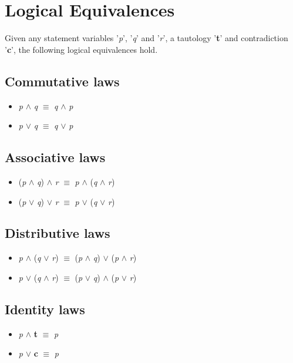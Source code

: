 \documentclass{article}
\begin{document}
\section{Logical Equivalences}

Given any statement variables '\textit{p}', '\textit{q}' and '\textit{r}', a tautology '\textbf{t}' and contradiction '\textbf{c}', the following
logical equivalences hold.


\subsection{Commutative laws}
\begin{itemize} 
\item \textit{p} $\wedge$ \textit{q} $\equiv$ \textit{q} $\wedge$ \textit{p}
\item \textit{p} $\lor$ \textit{q} $\equiv$ \textit{q} $\lor$ \textit{p}
\end{itemize}

\subsection{Associative laws}
\begin{itemize}
\item (\textit{p} $\wedge$ \textit{q}) $\wedge$ \textit{r} $\equiv$ \textit{p} $\wedge$ (\textit{q} $\wedge$ \textit{r})
\item (\textit{p} $\lor$ \textit{q}) $\lor$ \textit{r} $\equiv$ \textit{p} $\lor$ (\textit{q} $\lor$ \textit{r})
\end{itemize}

\subsection{Distributive laws}
\begin{itemize}
\item \textit{p} $\wedge$ (\textit{q} $\lor$ \textit{r}) $\equiv$ (\textit{p} $\wedge$ \textit{q}) $\lor$ (\textit{p} $\wedge$ \textit{r})
\item \textit{p} $\lor$ (\textit{q} $\wedge$ \textit{r}) $\equiv$ (\textit{p} $\lor$ \textit{q}) $\wedge$ (\textit{p} $\lor$ \textit{r})
\end{itemize}

\subsection{Identity laws}
\begin{itemize}
\item \textit{p} $\wedge$ \textbf{t} $\equiv$ \textit{p}
\item \textit{p} $\lor$ \textbf{c} $\equiv$ \textit{p}
\end{itemize}
\end{document}

